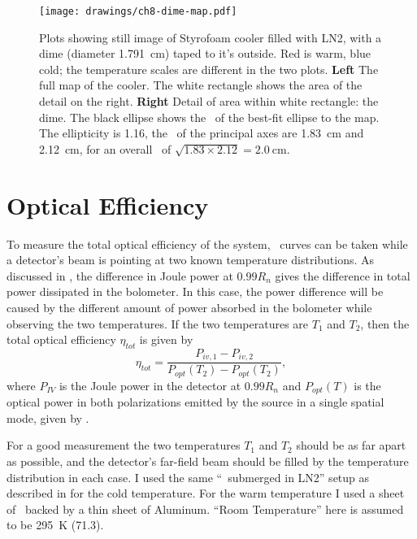 \begin{figure}
\centering
\texttt{[image: drawings/ch8-dime-map.pdf]}
\caption[Image of LN2 cooler with dime]{
  Plots showing still image of Styrofoam cooler filled with LN2, with a dime (diameter \SI{1.791}{\cm}) taped to it's outside.
  Red is warm, blue cold; the temperature scales are different in the two plots.
  \textbf{Left} The full map of the cooler. The white rectangle shows the area of the detail on the right.
  \textbf{Right} Detail of area within white rectangle: the dime.
  The black ellipse shows the \FWHM\ of the best-fit ellipse to the map. The ellipticity is \num{1.16}, the \FWHM\ of the principal axes are \SI{1.83}{\cm} and \SI{2.12}{\cm}, for an overall \FWHM\ of $\sqrt{1.83 \times 2.12} = \SI{2.0}{\cm}$.
}
\label{fig:ch8-dime-map}
\end{figure}

\section{Optical Efficiency} \label{sec:ch8-opt-eff}

To measure the total optical efficiency of the system, \IV\ curves can be taken while a detector's beam is pointing at two known temperature distributions.
As discussed in , the difference in Joule power at $0.99 R_n$ gives the difference in total power dissipated in the bolometer.
In this case, the power difference will be caused by the different amount of power absorbed in the bolometer while observing the two temperatures.
If the two temperatures are $T_1$ and $T_2$, then the total optical efficiency $\eta_{tot}$ is given by
\begin{equation}
  \eta_{tot} = \frac{P_{iv,1} - P_{iv,2}}{P_{opt}(T_2) - P_{opt}(T_2)},
\end{equation}
where $P_{IV}$ is the Joule power in the detector at $0.99 R_n$ and $P_{opt}(T)$ is the optical power in both polarizations emitted by the source in a single spatial mode, given by .

For a good measurement the two temperatures $T_1$ and $T_2$ should be as far apart as possible, and the detector's far-field beam should be filled by the temperature distribution in each case.
I used the same ``\ecco\ submerged in LN2'' setup as described in  for the cold temperature.
For the warm temperature I used a sheet of \ecco\ backed by a thin sheet of Aluminum.
``Room Temperature'' here is assumed to be \SI{295}{\kelvin} (\SI{71.3}{\fahrenheit}).

